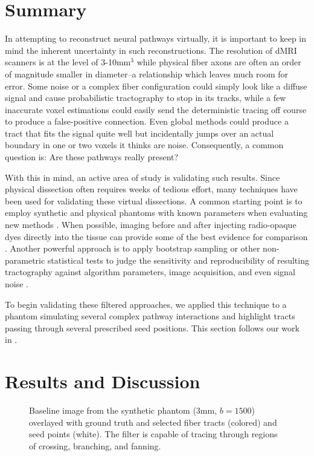 \documentclass[final,hyperref]{gatech-thesis}
\newcommand{\citet}[1]{\cite{#1}} %
\newcommand{\bn}[1]{\ensuremath{b\!=\!#1}\xspace}
\begin{document}
\section{Summary}
In attempting to reconstruct neural pathways virtually, it is important to
keep in mind the inherent uncertainty in such reconstructions.  The resolution
of dMRI scanners is at the level of 3-10mm$^3$ while physical fiber axons are
often an order of magnitude smaller in diameter--a relationship which leaves
much room for error.
%
Some noise or a complex fiber configuration could simply look like a diffuse
signal and cause probabilistic tractography to stop in its tracks, while a few
inaccurate voxel estimations could easily send the deterministic tracing off
course to produce a false-positive connection.  Even global methods could
produce a tract that fits the signal quite well but incidentally jumps over an
actual boundary in one or two voxels it thinks are noise.  Consequently, a
common question is: Are these pathways really present?

With this in mind, an active area of study is validating such results.  Since
physical dissection often requires weeks of tedious effort, many techniques
have been used for validating these virtual dissections.
%
A common starting point is to employ synthetic and physical phantoms with
known parameters when evaluating new methods \cite{Poupon2008phantom}.
%
When possible, imaging before and after injecting radio-opaque dyes directly
into the tissue can provide some of the best evidence for comparison
\cite{Lin2003,Dauguet2007}.
%
Another powerful approach is to apply bootstrap sampling or other
non-parametric statistical tests to judge the sensitivity and reproducibility
of resulting tractography against algorithm parameters, image acquisition, and
even signal noise
\cite{Lazar2005,Jones2005,Gigandet2008,Whitcher2008,Chung2006,Clayden2007}.

To begin validating these filtered approaches, we applied this technique to a
phantom simulating several complex pathway interactions and highlight tracts
passing through several prescribed seed positions.  This section follows our
work in \citet{Malcolm2009fc}.

\section{Results and Discussion}

\begin{figure}[t]
  \centering
  \caption{Baseline image from the synthetic phantom (3mm, \bn{1500})
    overlayed with ground truth and selected fiber tracts (colored) and seed
    points (white).  The filter is capable of tracing through regions of
    crossing, branching, and fanning.}
  \label{fig:phantom}
\end{figure}
\end{document}
